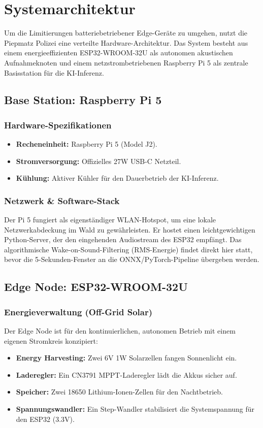 \documentclass[10pt, a4paper]{scrartcl}
\begin{document}
\section*{Systemarchitektur}
Um die Limitierungen batteriebetriebener Edge-Geräte zu umgehen, nutzt die Piepmatz Polizei eine verteilte Hardware-Architektur. Das System besteht aus einem energieeffizienten ESP32-WROOM-32U als autonomen akustischen Aufnahmeknoten und einem netzstrombetriebenen Raspberry Pi 5 als zentrale Basisstation für die KI-Inferenz.

\subsection*{Base Station: Raspberry Pi 5}
\subsubsection*{Hardware-Spezifikationen}
\begin{itemize}
    \item \textbf{Recheneinheit:} Raspberry Pi 5 (Model J2).
    \item \textbf{Stromversorgung:} Offizielles 27W USB-C Netzteil.
    \item \textbf{Kühlung:} Aktiver Kühler für den Dauerbetrieb der KI-Inferenz.
\end{itemize}

\subsubsection*{Netzwerk \& Software-Stack}
Der Pi 5 fungiert als eigenständiger WLAN-Hotspot, um eine lokale Netzwerkabdeckung im Wald zu gewährleisten. Er hostet einen leichtgewichtigen Python-Server, der den eingehenden Audiostream des ESP32 empfängt. Das algorithmische Wake-on-Sound-Filtering (RMS-Energie) findet direkt hier statt, bevor die 5-Sekunden-Fenster an die ONNX/PyTorch-Pipeline übergeben werden.

\subsection*{Edge Node: ESP32-WROOM-32U}
\subsubsection*{Energieverwaltung (Off-Grid Solar)}
Der Edge Node ist für den kontinuierlichen, autonomen Betrieb mit einem eigenen Stromkreis konzipiert:
\begin{itemize}
    \item \textbf{Energy Harvesting:} Zwei 6V 1W Solarzellen fangen Sonnenlicht ein.
    \item \textbf{Laderegler:} Ein CN3791 MPPT-Laderegler lädt die Akkus sicher auf.
    \item \textbf{Speicher:} Zwei 18650 Lithium-Ionen-Zellen für den Nachtbetrieb.
    \item \textbf{Spannungswandler:} Ein Step-Wandler stabilisiert die Systemspannung für den ESP32 (3.3V).
\end{itemize}
\end{document}
